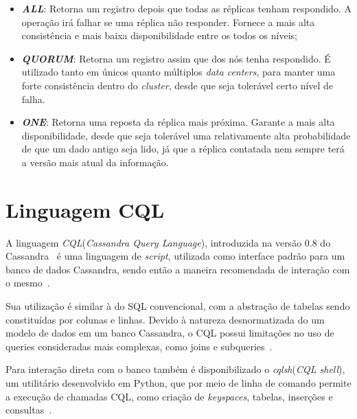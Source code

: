 \begin{itemize}

\item \textbf{\emph{ALL}}: Retorna um registro depois que todas as réplicas tenham respondido. A operação irá falhar se uma réplica não responder. Fornece a mais alta consistência e mais baixa disponibilidade entre os todos os níveis; 

\item \textbf{\emph{QUORUM}}: Retorna um registro assim que dos nós tenha respondido. É utilizado tanto em únicos quanto múltiplos \emph{data centers}, para manter uma forte consistência dentro do \emph{cluster}, desde que seja tolerável certo nível de falha.

\item \textbf{\emph{ONE}}: Retorna uma reposta da réplica mais próxima. Garante a mais alta disponibilidade, desde que seja tolerável uma relativamente alta probabilidade de que um dado antigo seja lido, já que a réplica contatada nem sempre terá a versão mais atual da informação.

\end{itemize}

\section{Linguagem CQL}
A linguagem \emph{CQL}(\emph{Cassandra Query Language}), introduzida na versão 0.8 do Cassandra~\cite{cassandra08} é uma linguagem de \emph{script}, utilizada como interface padrão para um banco de dados Cassandra, sendo então a maneira recomendada de interação com o mesmo~\cite{cassandraguide}. 

Sua utilização é similar à do SQL convencional, com a abstração de tabelas sendo constituídas por colunas e linhas. Devido à natureza desnormatizada do um modelo de dados em um banco Cassandra, o CQL possui limitações no uso de queries consideradas mais complexas, como joins e subqueries~\cite{cassandraguide}.

Para interação direta com o banco também é disponibilizado o \emph{cqlsh}(\emph{CQL shell}), um utilitário desenvolvido em Python, que por meio de linha de comando permite a execução de chamadas CQL, como criação de \emph{keyspaces}, tabelas, inserções e consultas~\cite{cassandra_intro_cql}.
